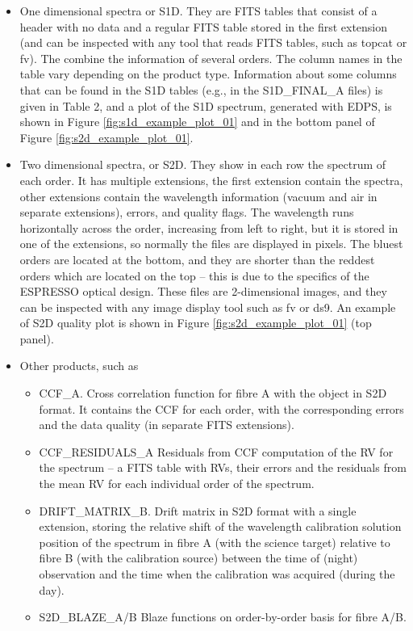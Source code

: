 \begin{itemize}
\item One dimensional spectra or S1D. They are FITS tables that
  consist of a header with no data and a regular FITS table stored in
  the first extension (and can be inspected with any tool that reads
  FITS tables, such as topcat or fv). The combine the information of
  several orders. The column names in the table vary depending on the
  product type. Information about some columns that can be found in
  the S1D tables (e.g., in the S1D\_FINAL\_A files) is given in Table 2,
  and a plot of the S1D spectrum, generated with EDPS, is shown in
  Figure \ref{fig:s1d_example_plot_01} and in the bottom panel of
  Figure \ref{fig:s2d_example_plot_01}.
  
\item Two dimensional spectra, or S2D. They show in each row the
  spectrum of each order. It has multiple extensions, the first
  extension contain the spectra, other extensions contain the
  wavelength information (vacuum and air in separate extensions),
  errors, and quality flags. The wavelength runs horizontally across
  the order, increasing from left to right, but it is stored in one of
  the extensions, so normally the files are displayed in pixels. The
  bluest orders are located at the bottom, and they are shorter than
  the reddest orders which are located on the top – this is due to the
  specifics of the ESPRESSO optical design. These files are
  2-dimensional images, and they can be inspected with any image
  display tool such as fv or ds9. An example of S2D quality plot is
  shown in Figure \ref{fig:s2d_example_plot_01} (top panel).

\item Other products, such as
  \begin{itemize}
    \item CCF\_A. Cross correlation function for fibre A with the
      object in S2D format. It contains the CCF for each order, with
      the corresponding errors and the data quality (in separate FITS
      extensions).
    \item CCF\_RESIDUALS\_A Residuals from CCF computation of the RV
      for the spectrum – a FITS table with RVs, their errors and the
      residuals from the mean RV for each individual order of the
      spectrum.
   \item DRIFT\_MATRIX\_B. Drift matrix in S2D format with a single
     extension, storing the relative shift of the wavelength
     calibration solution position of the spectrum in fibre A (with
     the science target) relative to fibre B (with the calibration
     source) between the time of (night) observation and the time when
     the calibration was acquired (during the day).	
   \item S2D\_BLAZE\_A/B Blaze functions on order-by-order basis for
     fibre A/B.
\end{itemize}
  \end{itemize}

